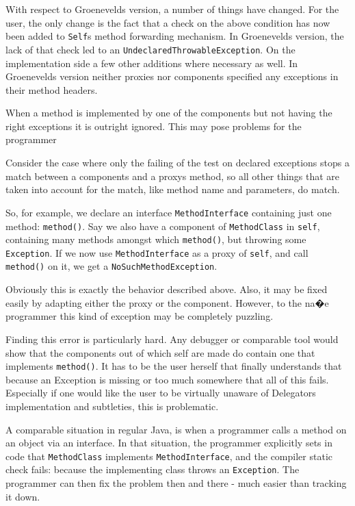 \documentclass[a4paper,12pt]{book}
\begin{document}
With respect to Groenevelds version, a number of things have changed. For the user, the only change is the fact that a check on the above condition has now been added to \verb|Self|s method forwarding mechanism. In Groenevelds version, the lack of that check led to an \verb|UndeclaredThrowableException|. On the implementation side a few other additions where necessary as well. In Groenevelds version neither proxies nor components specified any exceptions in their method headers.

When a method is implemented by one of the components but not having the right exceptions it is outright ignored. This may pose problems for the programmer 

Consider the case where only the failing of the test on declared exceptions stops a match between a components and a proxys method, so all other things that are taken into account for the match, like method name and parameters, do match.

So, for example, we declare an interface \verb|MethodInterface| containing just one method: \verb|method()|. Say we also have a component of \verb|MethodClass| in \verb|self|, containing many methods amongst which \verb|method()|, but throwing some \verb|Exception|. If we now use \verb|MethodInterface| as a proxy of \verb|self|, and call \verb|method()| on it, we get a \verb|NoSuchMethodException|. 

Obviously this is exactly the behavior described above. Also, it may be fixed easily by adapting either the proxy or the component. However, to the na�e programmer this kind of exception may be completely puzzling.

Finding this error is particularly hard. Any debugger or comparable tool would show that the components out of which self are made do contain one that implements \verb|method()|. It has to be the user herself that finally understands that because an Exception is missing or too much somewhere that all of this fails. Especially if one would like the user to be virtually unaware of Delegators implementation and subtleties, this is problematic.

A comparable situation in regular Java, is when a programmer calls a method on an object via an interface. In that situation, the programmer explicitly sets in code that \verb|MethodClass| implements \verb|MethodInterface|, and the compiler static check fails: because the implementing class throws an \verb|Exception|. The programmer can then fix the problem then and there - much easier than tracking it down.
\end{document}
